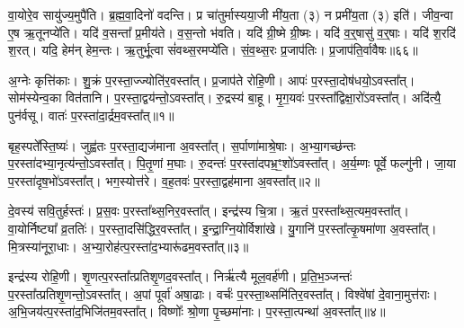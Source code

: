 वा॒योरे॒व सायु॑ज्य॒मुपै॑ति।
ब्र॒ह्म॒वा॒दिनो॑ वदन्ति।
प्र चा॑तुर्मास्यया॒जी मी॑य॒ता (३) न प्रमी॑य॒ता (३) इति॑।
जीव॒न्वा ए॒ष ऋ॒तूनप्ये॑ति।
यदि॑ व॒सन्ता᳚ प्र॒मीय॑ते।
व॒स॒न्तो भ॑वति।
यदि॑ ग्री॒ष्मे ग्री॒ष्मः।
यदि॑ व॒र्॒षासु॑ व॒र्॒षाः।
यदि॑ श॒रदि॑ श॒रत्।
यदि॒ हेम॑न् हेम॒न्तः।
ऋ॒तुर्भू॒त्वा सं॑वथ्स॒रमप्ये॑ति।
सं॒व॒थ्स॒रः प्र॒जा\-प॑तिः।
प्र॒जा\-प॑ति॒र्वावैषः॥६६॥






\clearpage
{}
\setcounter{anuvakam}{0}

अ॒ग्नेः कृत्ति॑काः।
शु॒क्रं प॒रस्ता॒ज्ज्योति॑र॒वस्ता᳚त्।
प्र॒जा\-प॑ते रोहि॒णी।
आपः॑ प॒रस्ता॒दोष॑धयो॒\-ऽवस्ता᳚त्।
सोम॑स्येन्व॒का वित॑तानि।
प॒रस्ता॒द्वय॑न्तो॒\-ऽवस्ता᳚त्।
रु॒द्रस्य॑ बा॒हू।
मृ॒ग॒यवः॑ प॒रस्ता᳚द्विक्षा॒रो॑\-ऽवस्ता᳚त्।
अदि॑त्यै॒ पुन॑र्वसू।
वातः॑ प॒रस्ता॑दा॒र्द्रम॒वस्ता᳚त्॥१॥

बृह॒स्पते᳚स्ति॒ष्यः॑।
जुह्व॑तः प॒रस्ता॒द्यज॑माना अ॒वस्ता᳚त्।
स॒र्पाणा॑माश्रे॒षाः।
अ॒भ्या॒गच्छ॑न्तः प॒रस्ता॑दभ्या॒नृत्य॑न्तो॒\-ऽवस्ता᳚त्।
पि॒तृ॒णां म॒घाः।
रु॒दन्तः॑ प॒रस्ता॑दपभ्र॒ꣳ॒शो॑\-ऽवस्ता᳚त्।
अ॒र्य॒म्णः पूर्वे॒ फल्गु॑नी।
जा॒या प॒रस्ता॑दृष॒भो॑\-ऽवस्ता᳚त्।
भग॒स्योत्त॑रे।
व॒ह॒तवः॑ प॒रस्ता॒द्वह॑माना अ॒वस्ता᳚त्॥२॥

दे॒वस्य॑ सवि॒तुर्\mbox{}हस्तः॑।
प्र॒स॒वः प॒रस्ता᳚थ्स॒निर॒वस्ता᳚त्।
इन्द्र॑स्य चि॒त्रा।
ऋ॒तं प॒रस्ता᳚थ्स॒त्यम॒वस्ता᳚त्।
वा॒योर्निष्ट्या᳚ व्र॒ततिः॑।
प॒रस्ता॒दसि॑द्धिर॒वस्ता᳚त्।
इ॒न्द्रा॒ग्नि॒योर्विशा॑खे।
यु॒गानि॑ प॒रस्ता᳚त्कृ॒षमा॑णा अ॒वस्ता᳚त्।
मि॒त्रस्या॑नूरा॒धाः।
अ॒भ्या॒रोह॑त्प॒रस्ता॑\-द॒भ्यारू॑ढम॒वस्ता᳚त्॥३॥

इन्द्र॑स्य रोहि॒णी।
शृ॒णत्प॒रस्ता᳚त्प्रतिशृ॒णद॒वस्ता᳚त्।
निर्\mbox{}ऋ॑त्यै मूल॒वर्\mbox{}ह॑णी।
प्र॒ति॒भ॒ञ्जन्तः॑ प॒रस्ता᳚त्प्रतिशृ॒णन्तो॒\-ऽवस्ता᳚त्।
अ॒पां पूर्वा॑ अषा॒ढाः।
वर्चः॑ प॒रस्ता॒थ्समि॑तिर॒वस्ता᳚त्।
विश्वे॑षां दे॒वाना॒मुत्त॑राः।
अ॒भि॒जय॑त्प॒रस्ता॑द॒भिजि॑तम॒वस्ता᳚त्।
विष्णोः᳚ श्रो॒णा पृ॒च्छमा॑नाः।
प॒रस्ता॒त्पन्था॑ अ॒वस्ता᳚त्॥४॥

